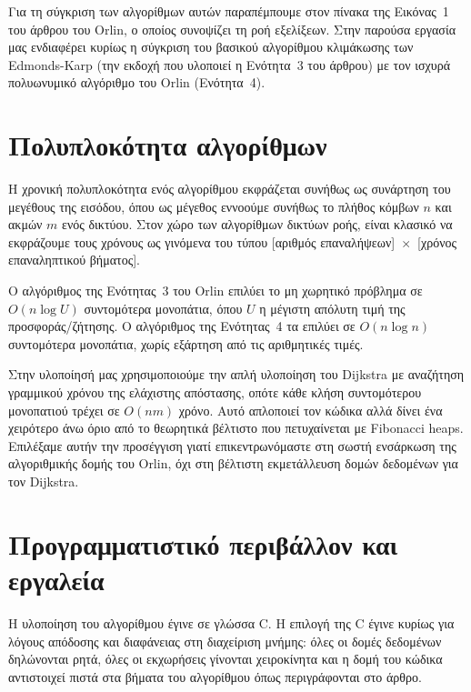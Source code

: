 \documentclass[11pt,a4paper,oneside]{report}
\begin{document}
Για τη σύγκριση των αλγορίθμων αυτών παραπέμπουμε στον πίνακα της Εικόνας~1 του άρθρου του \textenglish{Orlin}, ο οποίος συνοψίζει τη ροή εξελίξεων. Στην παρούσα εργασία μας ενδιαφέρει κυρίως η σύγκριση του βασικού αλγορίθμου κλιμάκωσης των \textenglish{Edmonds-Karp} (την εκδοχή που υλοποιεί η Ενότητα~3 του άρθρου) με τον ισχυρά πολυωνυμικό αλγόριθμο του \textenglish{Orlin} (Ενότητα~4).

\section{Πολυπλοκότητα αλγορίθμων}

Η χρονική πολυπλοκότητα ενός αλγορίθμου εκφράζεται συνήθως ως συνάρτηση του μεγέθους της εισόδου, όπου ως μέγεθος εννοούμε συνήθως το πλήθος κόμβων $n$ και ακμών $m$ ενός δικτύου. Στον χώρο των αλγορίθμων δικτύων ροής, είναι κλασικό να εκφράζουμε τους χρόνους ως γινόμενα του τύπου [αριθμός επαναλήψεων]~$\times$~[χρόνος επαναληπτικού βήματος].

Ο αλγόριθμος της Ενότητας~3 του \textenglish{Orlin} επιλύει το μη χωρητικό πρόβλημα σε $O(n\log U)$ συντομότερα μονοπάτια, όπου $U$ η μέγιστη απόλυτη τιμή της προσφοράς/ζήτησης. Ο αλγόριθμος της Ενότητας~4 τα επιλύει σε $O(n \log n)$ συντομότερα μονοπάτια, χωρίς εξάρτηση από τις αριθμητικές τιμές.

Στην υλοποίησή μας χρησιμοποιούμε την απλή υλοποίηση του \textenglish{Dijkstra} με αναζήτηση γραμμικού χρόνου της ελάχιστης απόστασης, οπότε κάθε κλήση συντομότερου μονοπατιού τρέχει σε $O(nm)$ χρόνο. Αυτό απλοποιεί τον κώδικα αλλά δίνει ένα χειρότερο άνω όριο από το θεωρητικά βέλτιστο που πετυχαίνεται με \textenglish{Fibonacci heaps}. Επιλέξαμε αυτήν την προσέγγιση γιατί επικεντρωνόμαστε στη σωστή ενσάρκωση της αλγοριθμικής δομής του \textenglish{Orlin}, όχι στη βέλτιστη εκμετάλλευση δομών δεδομένων για τον \textenglish{Dijkstra}.

\section{Προγραμματιστικό περιβάλλον και εργαλεία}

Η υλοποίηση του αλγορίθμου έγινε σε γλώσσα \textenglish{C}. Η επιλογή της \textenglish{C} έγινε κυρίως για λόγους απόδοσης και διαφάνειας στη διαχείριση μνήμης: όλες οι δομές δεδομένων δηλώνονται ρητά, όλες οι εκχωρήσεις γίνονται χειροκίνητα και η δομή του κώδικα αντιστοιχεί πιστά στα βήματα του αλγορίθμου όπως περιγράφονται στο άρθρο.
\end{document}
